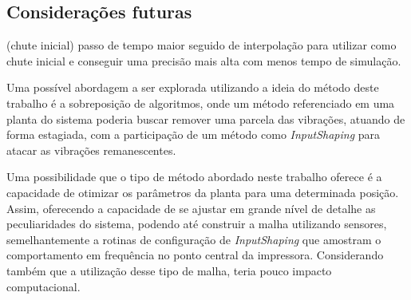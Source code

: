 \subsection{Considerações futuras}
(chute inicial) passo de tempo maior seguido de interpolação para utilizar como chute inicial e conseguir uma precisão mais alta com menos tempo de simulação.

Uma possível abordagem a ser explorada utilizando a ideia do método deste trabalho é a sobreposição de algoritmos, onde
um método referenciado em uma planta do sistema poderia buscar remover uma parcela das vibrações, atuando de forma estagiada,
com a participação de um método como \textit{InputShaping} para atacar as vibrações remanescentes.

Uma possibilidade que o tipo de método abordado neste trabalho oferece é a capacidade de otimizar os parâmetros da planta para uma determinada posição.
Assim, oferecendo a capacidade de se ajustar em grande nível de detalhe as peculiaridades do sistema, podendo até
construir a malha utilizando sensores, semelhantemente a rotinas de configuração de \textit{InputShaping} que amostram
o comportamento em frequência no ponto central da impressora. Considerando também que a utilização desse tipo de malha,
teria pouco impacto computacional.


